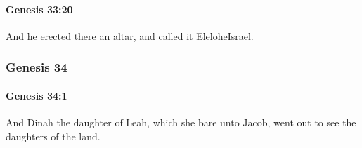 		\paragraph{Genesis 33:20} %
			\label{GENESIS-33-20}

			And he erected there an altar, and called it EleloheIsrael.

	\subsubsection{Genesis 34} %
		\label{GENESIS-34}

		\paragraph{Genesis 34:1} %
			\label{GENESIS-34-1}

			And Dinah the daughter of Leah, which she bare unto Jacob, went out to see the daughters of the land.


